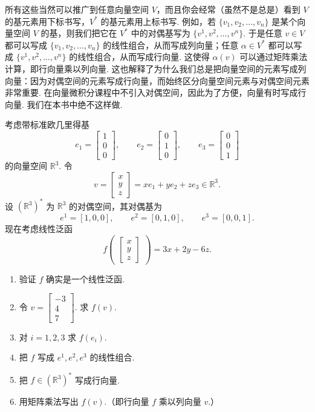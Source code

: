 所有这些当然可以推广到任意向量空间 $V$，而且你会经常（虽然不是总是）看到 $V$ 的基元素用下标书写，$V^*$ 的基元素用上标书写. 例如，若 $\{v_1,v_2,\ldots,v_n\}$ 是某个向量空间 $V$ 的基，则我们把它在 $V^*$ 中的对偶基写为 $\{v^1,v^2,\ldots,v^n\}$. 于是任意 $v\in V$ 都可以写成 $\{v_1,v_2,\ldots,v_n\}$ 的线性组合，从而写成列向量；任意 $\alpha\in V^*$ 都可以写成 $\{v^1,v^2,\ldots,v^n\}$ 的线性组合，从而写成行向量. 这使得 $\alpha(v)$ 可以通过矩阵乘法计算，即行向量乘以列向量. 这也解释了为什么我们总是把向量空间的元素写成列向量：因为对偶空间的元素写成行向量，而始终区分向量空间元素与对偶空间元素非常重要. 在向量微积分课程中不引入对偶空间，因此为了方便，向量有时写成行向量. 我们在本书中绝不这样做.

\begin{question}\label{q:1-9}
考虑带标准欧几里得基
\[
e_1=\begin{bmatrix}1\\0\\0\end{bmatrix},\qquad e_2=\begin{bmatrix}0\\1\\0\end{bmatrix},\qquad e_3=\begin{bmatrix}0\\0\\1\end{bmatrix}
\]
的向量空间 $\mathbb{R}^3$. 令
\[
v=\begin{bmatrix}x\\y\\z\end{bmatrix}=xe_1+ye_2+ze_3\in\mathbb{R}^3.
\]
设 $(\mathbb{R}^3)^*$ 为 $\mathbb{R}^3$ 的对偶空间，其对偶基为
\[
e^1=[1,0,0],\qquad e^2=[0,1,0],\qquad e^3=[0,0,1].
\]
现在考虑线性泛函
\[
f\begin{pmatrix}\begin{bmatrix}x\\y\\z\end{bmatrix}\end{pmatrix}=3x+2y-6z.
\]
\begin{enumerate}
  \item[(a)] 验证 $f$ 确实是一个线性泛函.
  \item[(b)] 令 $v=\begin{bmatrix}-3\\4\\7\end{bmatrix}$. 求 $f(v)$.
  \item[(c)] 对 $i=1,2,3$ 求 $f(e_i)$.
  \item[(d)] 把 $f$ 写成 $e^1,e^2,e^3$ 的线性组合.
  \item[(e)] 把 $f\in(\mathbb{R}^3)^*$ 写成行向量.
  \item[(f)] 用矩阵乘法写出 $f(v)$.（即行向量 $f$ 乘以列向量 $v$.）
\end{enumerate}
\end{question}

